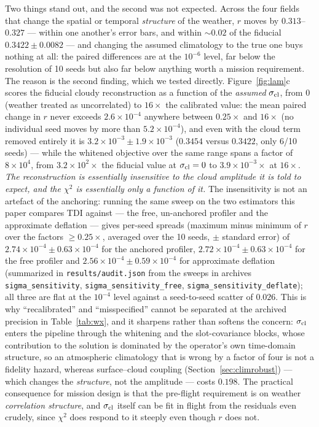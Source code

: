 \documentclass[twocolumn,10pt]{article}
\begin{document}
Two things stand out, and the second was not expected. Across the four
fields that change the spatial or temporal \emph{structure} of the weather, $r$
moves by $0.313$--$0.327$ --- within one another's error bars, and within
$\sim0.02$ of the fiducial $0.3422\pm0.0082$ --- and changing the assumed
climatology to the true one buys nothing at all: the paired differences are at
the $10^{-6}$ level, far below the resolution of 10 seeds but also far below
anything worth a mission requirement. The reason is the second finding, which we
tested directly. Figure~\ref{fig:lam}c scores the fiducial cloudy reconstruction
as a function of the \emph{assumed} $\sigma_{\rm cl}$, from $0$ (weather treated
as uncorrelated) to $16\times$ the calibrated value: the mean paired change in
$r$ never exceeds $2.6\times10^{-4}$ anywhere between $0.25\times$ and $16\times$
(no individual seed moves by more than $5.2\times10^{-4}$), and
even with the cloud term removed entirely it is $3.2\times10^{-3}\pm1.9\times10^{-3}$
($0.3454$ versus $0.3422$, only 6/10 seeds) --- while the whitened objective over
the same range spans a factor of $8\times10^{4}$, from $3.2\times10^{2}\times$
the fiducial value at $\sigma_{\rm cl}=0$ to $3.9\times10^{-3}\times$ at
$16\times$. \emph{The reconstruction is essentially insensitive to the cloud
amplitude it is told to expect, and the $\chi^2$ is essentially only a function
of it.} The insensitivity is not an artefact of the anchoring: running the same
sweep on the two estimators this paper compares TDI against --- the free,
un-anchored profiler and the approximate deflation --- gives per-seed spreads
(maximum minus minimum of $r$ over the factors $\ge0.25\times$, averaged over
the 10 seeds, $\pm$ standard error) of
$2.74\times10^{-4}\pm0.63\times10^{-4}$ for the
anchored profiler, $2.72\times10^{-4}\pm0.63\times10^{-4}$ for the free profiler and
$2.56\times10^{-4}\pm0.59\times10^{-4}$ for approximate deflation (summarized in {\tt results/audit.json} from the sweeps in archives {\tt
sigma\_sensitivity}, {\tt sigma\_sensitivity\_free}, {\tt sigma\_sensitivity\_deflate}); all three are flat at the
$10^{-4}$ level against a seed-to-seed scatter of $0.026$. This is why ``recalibrated'' and
``misspecified'' cannot be separated at the archived precision in Table~\ref{tab:wx}, and it sharpens
rather than softens the concern: $\sigma_{\rm cl}$ enters the pipeline
through the whitening and the slot-covariance blocks, whose contribution to the
solution is dominated by the operator's own time-domain structure, so an
atmospheric climatology that is wrong by a factor of four is not a fidelity
hazard, whereas surface--cloud coupling (Section~\ref{sec:climrobust}) --- which
changes the \emph{structure}, not the amplitude --- costs $0.198$. The practical
consequence for mission design is that the pre-flight requirement is on weather
\emph{correlation structure}, and $\sigma_{\rm cl}$ itself can be fit in flight
from the residuals even crudely, since $\chi^2$ does respond to it steeply even
though $r$ does not.
\end{document}
